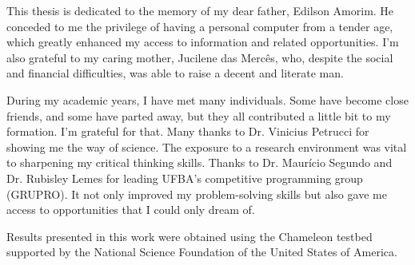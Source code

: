 This thesis is dedicated to the memory of my dear father, Edilson Amorim. He conceded to me the privilege of having a personal computer from a tender age, which greatly enhanced my access to information and related opportunities. I'm also grateful to my caring mother, Jucilene das Mercês, who, despite the social and financial difficulties, was able to raise a decent and literate man.

During my academic years, I have met many individuals. Some have become close friends, and some have parted away, but they all contributed a little bit to my formation. I'm grateful for that. Many thanks to Dr. Vinicius Petrucci for showing me the way of science. The exposure to a research environment was vital to sharpening my critical thinking skills. Thanks to Dr. Maurício Segundo and Dr. Rubisley Lemes for leading UFBA's competitive programming group (GRUPRO). It not only improved my problem-solving skills but also gave me access to opportunities that I could only dream of.

Results presented in this work were obtained using the Chameleon testbed supported by the National Science Foundation of the United States of America.
